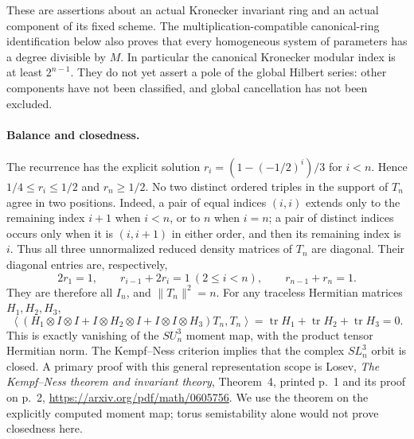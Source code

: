 These are assertions about an actual Kronecker invariant
ring and an actual component of its fixed scheme.
The multiplication-compatible canonical-ring identification
below also proves that every homogeneous system of parameters
has a degree divisible by $M$.  In particular the canonical
Kronecker modular index is at least $2^{n-1}$.
They do not yet assert a pole of the global Hilbert
series: other components have not been classified, and
global cancellation has not been excluded.

\paragraph{Balance and closedness.}
The recurrence has the explicit solution
$r_i=(1-(-1/2)^i)/3$ for $i<n$.
Hence $1/4\le r_i\le1/2$ and $r_n\ge1/2$.
No two distinct ordered triples in the support of $T_n$
agree in two positions.  Indeed, a pair of equal indices
$(i,i)$ extends only to the remaining index $i+1$
when $i<n$, or to $n$ when $i=n$; a pair of distinct
indices occurs only when it is $(i,i+1)$ in either order,
and then its remaining index is $i$.  Thus all three
unnormalized reduced density matrices of $T_n$ are
diagonal.  Their diagonal entries are, respectively,
\[
 2r_1=1,\qquad r_{i-1}+2r_i=1\ (2\le i<n),
                     \qquad r_{n-1}+r_n=1.
                                                        \tag{P-F60g}
\]
They are therefore all $I_n$, and $\|T_n\|^2=n$.
For any traceless Hermitian matrices $H_1,H_2,H_3$,
\[
 \left\langle
 (H_1\otimes I\otimes I+I\otimes H_2\otimes I
                         +I\otimes I\otimes H_3)T_n,T_n
 \right\rangle
                  =\operatorname{tr}H_1+\operatorname{tr}H_2
                                      +\operatorname{tr}H_3=0.
                                                        \tag{P-F60h}
\]
This is exactly vanishing of the $SU_n^3$ moment map,
with the product tensor Hermitian norm.  The Kempf--Ness
criterion implies that the complex $SL_n^3$ orbit is
closed.  A primary proof with this general representation
scope is Losev, \emph{The Kempf--Ness theorem and invariant
theory}, Theorem~4, printed p.~1 and its proof on p.~2,
\url{https://arxiv.org/pdf/math/0605756}.
We use the theorem on the explicitly computed moment map;
torus semistability alone would not prove closedness here.

